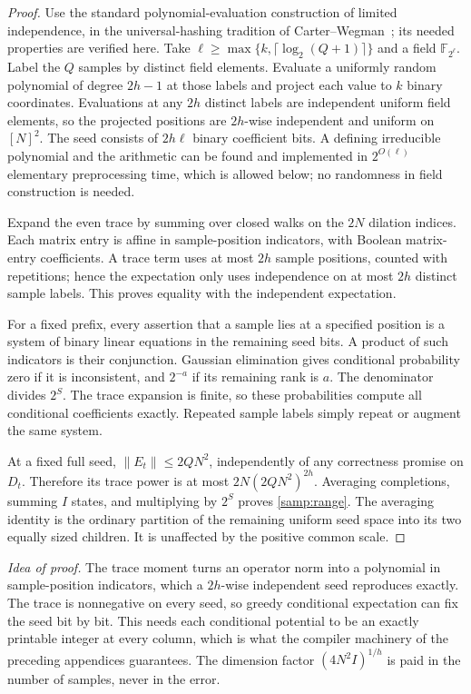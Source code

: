 \documentclass[11pt,letterpaper]{article}
\theoremstyle{definition}
\theoremstyle{remark}
\newcommand{\F}{\mathbb F}
\begin{document}
\begin{proof}
Use the standard polynomial-evaluation construction of limited
independence, in the universal-hashing tradition of
Carter--Wegman~\cite{CarterWegman}; its needed properties are verified
here. Take $\ell\ge\max\{k,\lceil\log_2(Q+1)\rceil\}$ and a field
$\F_{2^\ell}$. Label the $Q$ samples by distinct field elements.
Evaluate a uniformly random polynomial of degree $2h-1$ at those labels
and project each value to $k$ binary coordinates. Evaluations at any
$2h$ distinct labels are independent uniform field elements, so the
projected positions are $2h$-wise independent and uniform on $[N]^2$.
The seed consists of $2h\ell$ binary coefficient bits. A defining
irreducible polynomial and the arithmetic can be found and implemented
in $2^{O(\ell)}$ elementary preprocessing time, which is allowed below;
no randomness in field construction is needed.

Expand the even trace by summing over closed walks on the $2N$ dilation
indices. Each matrix entry is affine in sample-position indicators,
with Boolean matrix-entry coefficients. A trace term uses at most $2h$
sample positions, counted with repetitions; hence the expectation only
uses independence on at most $2h$ distinct sample labels. This proves
equality with the independent expectation.

For a fixed prefix, every assertion that a sample lies at a specified
position is a system of binary linear equations in the remaining seed
bits. A product of such indicators is their conjunction. Gaussian
elimination gives conditional probability zero if it is inconsistent,
and $2^{-a}$ if its remaining rank is $a$. The denominator divides
$2^S$. The trace expansion is finite, so these probabilities compute
all conditional coefficients exactly. Repeated sample labels simply
repeat or augment the same system.

At a fixed full seed, $\|E_t\|\le2QN^2$, independently of any
correctness promise on $D_t$. Therefore its trace power is at most
$2N(2QN^2)^{2h}$. Averaging completions, summing $I$ states, and
multiplying by $2^S$ proves \cref{samp:range}. The averaging identity
is the ordinary partition of the remaining uniform seed space into its
two equally sized children. It is unaffected by the positive common
scale.
\end{proof}

\emph{Idea of proof.} The trace moment turns an operator norm into a
polynomial in sample-position indicators, which a $2h$-wise
independent seed reproduces exactly. The trace is nonnegative on
every seed, so greedy conditional expectation can fix the seed bit by
bit. This needs each conditional potential to be an exactly printable
integer at every column, which is what the compiler machinery of the
preceding appendices guarantees. The dimension factor $(4N^2I)^{1/h}$
is paid in the number of samples, never in the error.
\end{document}
